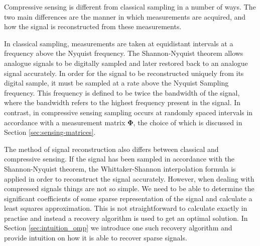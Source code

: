 Compressive sensing is different from classical sampling in a number of ways. The two main differences are the manner in which measurements are acquired, and how the signal is reconstructed from these measurements.

 In classical sampling, measurements are taken at equidistant intervals at a frequency above the Nyquist frequency. The Shannon-Nyquist theorem \citep{Shannon1949} allows analogue signals to be digitally sampled and later restored back to an analogue signal accurately. In order for the signal to be reconstructed uniquely from its digital sample, it must be sampled at a rate  above the Nyquist Sampling frequency. This frequency is defined to be twice the bandwidth of the signal, where the bandwidth refers to the highest frequency present in the signal.  In contrast, in compressive sensing sampling occurs at randomly spaced intervals in accordance with a measurement matrix $\boldsymbol{\Phi}$, the choice of which is discussed in Section \ref{sec:sensing-matrices}. 

The method of signal reconstruction also differs between classical and compressive sensing. If the signal has been sampled in accordance with the Shannon-Nyquist theorem, the Whittaker-Shannon interpolation formula is applied in order to reconstruct the signal accurately. However, when dealing with compressed signals things are not so simple. We need to be able to determine the significant coefficients of some sparse representation of the signal and calculate a least squares approximation. This is not straightforward to calculate exactly in practise and instead a recovery algorithm is used to get an optimal solution. In Section \ref{sec:intuition_omp} we introduce one such recovery algorithm and provide intuition on how it is able to recover sparse signals. %

